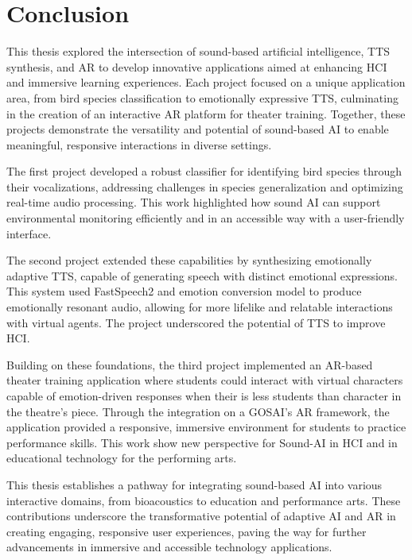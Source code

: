 \section{Conclusion}
This thesis explored the intersection of sound-based artificial intelligence, TTS synthesis, and AR to develop innovative applications aimed at enhancing HCI and immersive learning experiences. Each project focused on a unique application area, from bird species classification to emotionally expressive TTS, culminating in the creation of an interactive AR platform for theater training. Together, these projects demonstrate the versatility and potential of sound-based AI to enable meaningful, responsive interactions in diverse settings.

The first project developed a robust classifier for identifying bird species through their vocalizations, addressing challenges in species generalization and optimizing real-time audio processing. This work highlighted how sound AI  can support environmental monitoring efficiently and in an accessible way with a user-friendly interface.

The second project extended these capabilities by synthesizing emotionally adaptive TTS, capable of generating speech with distinct emotional expressions. This system used FastSpeech2 and emotion conversion model to produce emotionally resonant audio, allowing for more lifelike and relatable interactions with virtual agents. The project underscored the potential of TTS to improve HCI.

Building on these foundations, the third project implemented an AR-based theater training application where students could interact with virtual characters capable of emotion-driven responses when their is less students than character in the theatre's piece. Through the integration on a GOSAI’s AR framework, the application provided a responsive, immersive environment for students to practice performance skills. This work show new perspective for Sound-AI in HCI and in educational technology for the performing arts.

This thesis establishes a pathway for integrating sound-based AI into various interactive domains, from bioacoustics to education and performance arts. These contributions underscore the transformative potential of adaptive AI and AR in creating engaging, responsive user experiences, paving the way for further advancements in immersive and accessible technology applications.